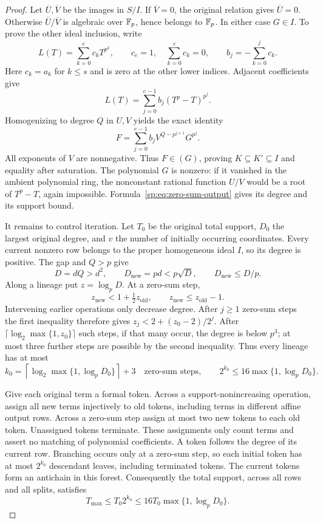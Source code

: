 \begin{proof}
Let $\overline U,\overline V$ be the images in $S/I$. If
$\overline V=0$, the original relation gives $\overline U=0$.
Otherwise $\overline U/\overline V$ is algebraic over $\mathbb F_p$,
hence belongs to $\mathbb F_p$. In either case $G\in I$.
To prove the other ideal inclusion, write
\[
 L(T)=\sum_{k=0}^e c_kT^{p^k},\qquad
 c_e=1,\quad \sum_{k=0}^e c_k=0,
 \qquad b_j=-\sum_{k=0}^j c_k.
\]
Here $c_k=a_k$ for $k\le s$ and is zero at the other lower indices.
Adjacent coefficients give
\[
 L(T)=\sum_{j=0}^{e-1}b_j(T^p-T)^{p^j}.
\]
Homogenizing to degree $Q$ in $U,V$ yields the exact identity
\begin{equation}
 F=\sum_{j=0}^{e-1}b_j
       V^{Q-p^{j+1}}G^{p^j}.
 \label{sp:eq:zero-sum-divisibility}
\end{equation}
All exponents of $V$ are nonnegative. Thus $F\in(G)$, proving
$K\subseteq K'\subseteq I$ and equality after saturation.
The polynomial $G$ is nonzero: if it vanished in the ambient
polynomial ring, the nonconstant rational function $U/V$ would be a
root of $T^p-T$, again impossible. Formula~\eqref{sp:eq:zero-sum-output}
gives its degree and its support bound.

It remains to control iteration. Let $T_0$ be the original total
support, $D_0$ the largest original degree, and $v$ the number of
initially occurring coordinates. Every current nonzero row belongs
to the proper homogeneous ideal $I$, so its degree is positive.
The gap and $Q>p$ give
\[
 D=dQ>d^2,\qquad D_{\mathrm{new}}=pd<p\sqrt D,
 \qquad D_{\mathrm{new}}\le D/p.
\]
Along a lineage put $z=\log_p D$. At a zero-sum step,
\[
 z_{\mathrm{new}}<1+\tfrac12z_{\mathrm{old}},
 \qquad z_{\mathrm{new}}\le z_{\mathrm{old}}-1.
\]
Intervening earlier operations only decrease degree. After $j\ge1$
zero-sum steps the first inequality therefore gives
$z_j<2+(z_0-2)/2^j$. After
$\lceil\log_2\max\{1,z_0\}\rceil$ such steps, if that many occur,
the degree is below $p^3$; at most three further steps are possible
by the second inequality. Thus every lineage has at most
\[
 k_0=\left\lceil\log_2\max\{1,\log_p D_0\}\right\rceil+3
 \quad\text{zero-sum steps},\qquad
 2^{k_0}\le16\max\{1,\log_p D_0\}.
\]

Give each original term a formal token. Across a
support-nonincreasing operation, assign all new terms injectively
to old tokens, including terms in different affine output rows.
Across a zero-sum step assign at most two new tokens to each old
token. Unassigned tokens terminate. These assignments only count
terms and assert no matching of polynomial coefficients. A token
follows the degree of its current row. Branching occurs only at a
zero-sum step, so each initial token has at most $2^{k_0}$ descendant
leaves, including terminated tokens. The current tokens form an
antichain in this forest. Consequently the total support, across
all rows and all splits, satisfies
\begin{equation}
 T_{\max}\le T_0 2^{k_0}
 \le16T_0\max\{1,\log_p D_0\}.
 \label{sp:eq:zero-sum-support-budget}
\end{equation}


\end{proof}
